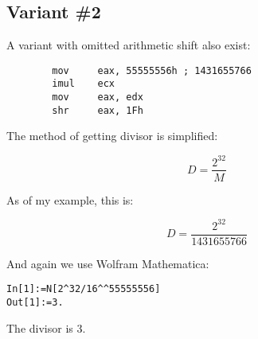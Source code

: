 \subsection{Variant \#2}

A variant with omitted arithmetic shift also exist:

\begin{lstlisting}
		mov     eax, 55555556h ; 1431655766
		imul    ecx
		mov     eax, edx
		shr     eax, 1Fh
\end{lstlisting}

The method of getting divisor is simplified:

\[
D=\frac{2^{32}}{M}
\]

As of my example, this is:

\[
D=\frac{2^{32}}{1431655766}
\]


And again we use Wolfram Mathematica:

\begin{lstlisting}[caption=Wolfram Mathematica]
In[1]:=N[2^32/16^^55555556]
Out[1]:=3.
\end{lstlisting}

The divisor is 3.
